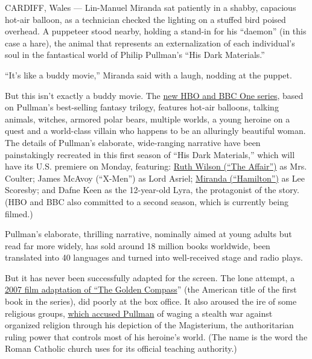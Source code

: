 CARDIFF, Wales --- Lin-Manuel Miranda sat patiently in a shabby,
capacious hot-air balloon, as a technician checked the lighting on a
stuffed bird poised overhead. A puppeteer stood nearby, holding a
stand-in for his ``daemon'' (in this case a hare), the animal that
represents an externalization of each individual's soul in the
fantastical world of Philip Pullman's ``His Dark Materials.''

``It's like a buddy movie,'' Miranda said with a laugh, nodding at the
puppet.

But this isn't exactly a buddy movie. The
\href{https://www.youtube.com/watch?v=APduGe1eLVI}{new HBO and BBC One
series}, based on Pullman's best-selling fantasy trilogy, features
hot-air balloons, talking animals, witches, armored polar bears,
multiple worlds, a young heroine on a quest and a world-class villain
who happens to be an alluringly beautiful woman. The details of
Pullman's elaborate, wide-ranging narrative have been painstakingly
recreated in this first season of ``His Dark Materials,'' which will
have its U.S. premiere on Monday, featuring:
\href{https://www.nytimes.com/2018/08/29/style/ruth-wilson-the-affair-little-stranger.html?searchResultPosition=4}{Ruth
Wilson (``The Affair'')} as Mrs. Coulter; James McAvoy (``X-Men'') as
Lord Asriel;
\href{https://www.nytimes.com/2015/02/18/theater/review-in-hamilton-lin-manuel-miranda-forges-democracy-through-rap.html?searchResultPosition=6}{Miranda
(``Hamilton'')} as Lee Scoresby; and Dafne Keen as the 12-year-old Lyra,
the protagonist of the story. (HBO and BBC also committed to a second
season, which is currently being filmed.)

Pullman's elaborate, thrilling narrative, nominally aimed at young
adults but read far more widely, has sold around 18 million books
worldwide, been translated into 40 languages and turned into
well-received stage and radio plays.

But it has never been successfully adapted for the screen. The lone
attempt, a
\href{https://www.nytimes.com/2007/12/07/movies/07comp.html?searchResultPosition=7}{2007
film adaptation of ``The Golden Compass}'' (the American title of the
first book in the series), did poorly at the box office. It also aroused
the ire of some religious groups,
\href{https://www.theguardian.com/uk/2007/oct/14/religion.books}{which
accused Pullman} of waging a stealth war against organized religion
through his depiction of the Magisterium, the authoritarian ruling power
that controls most of his heroine's world. (The name is the word the
Roman Catholic church uses for its official teaching authority.)

